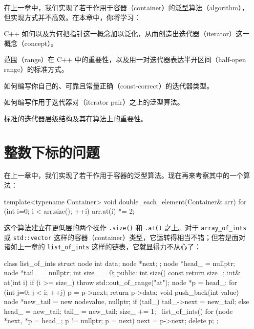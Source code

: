 在上一章中，我们实现了若干作用于容器（container）的泛型算法（algorithm），但实现方式并不高效。在本章中，你将学习：

C++ 如何以及为何把指针这一概念加以泛化，从而创造出迭代器（iterator）这一概念（concept）。

范围（range）在 C++ 中的重要性，以及用一对迭代器表达半开区间（half-open range）的标准方式。

如何编写你自己的、可靠且常量正确（const-correct）的迭代器类型。

如何编写作用于迭代器对（iterator pair）之上的泛型算法。

标准的迭代器层级结构及其在算法上的重要性。

\section{整数下标的问题}

在上一章中，我们实现了若干作用于容器的泛型算法。现在再来考察其中的一个算法：

\begin{codebox}[cpp]
    template<typename Container>
    void double_each_element(Container& arr)
    {
      for (int i=0; i < arr.size(); ++i) {
        arr.at(i) *= 2;
      }
    }
\end{codebox}

这个算法建立在更低层的两个操作 \texttt{.size(\allowbreak{})\allowbreak{}} 和 \texttt{.at(\allowbreak{})\allowbreak{}} 之上。对于 \texttt{array\_\allowbreak{}of\_\allowbreak{}ints} 或 \texttt{std::\allowbreak{}vector} 这样的容器（container）类型，它运转得相当不错；但若是面对诸如上一章的 \texttt{list\_\allowbreak{}of\_\allowbreak{}ints} 这样的链表，它就显得力不从心了：

\begin{codebox}[cpp]
    class list_of_ints {
      struct node {
        int data;
        node *next;
      };
      node *head_ = nullptr;
      node *tail_ = nullptr;
      int size_ = 0;
    public:
      int size() const { return size_; }
      int& at(int i) {
        if (i >= size_) throw std::out_of_range("at");
        node *p = head_;
        for (int j=0; j < i; ++j) {
          p = p->next;
        }
        return p->data;
      }
      void push_back(int value) {
        node *new_tail = new node{value, nullptr};
        if (tail_) {
          tail_->next = new_tail;
        } else {
          head_ = new_tail;
        }
        tail_ = new_tail;
        size_ += 1;
      }
      ~list_of_ints() {
        for (node *next, *p = head_; p != nullptr; p = next) {
          next = p->next;
          delete p;
        }
      }
    };
\end{codebox}

